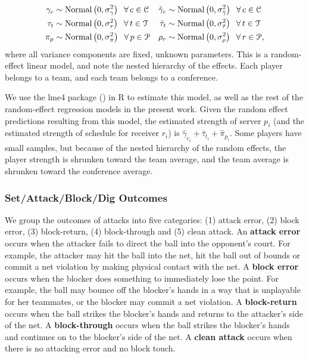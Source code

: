 \documentclass[USenglish]{article}
\theoremstyle{dgthm}
\theoremstyle{dgdef}
\begin{document}
\begin{align*}
  \gamma_c &\sim \mbox{Normal}\left(0, \sigma^2_\gamma\right) \hspace{2mm} \forall\, c \in \mathcal{C} &
  \tilde\gamma_c &\sim \mbox{Normal}\left(0, \sigma^2_{\tilde\gamma}\right) \hspace{2mm} \forall\, c \in \mathcal{C} \\
  \tau_t &\sim \mbox{Normal}\left(0, \sigma^2_\tau\right) \hspace{2mm} \forall\, t \in \mathcal{T} &
  \tilde\tau_t &\sim \mbox{Normal}\left(0, \sigma^2_{\tilde\tau}\right) \hspace{2mm} \forall\, t \in \mathcal{T} \\
  \pi_p &\sim \mbox{Normal}\left(0, \sigma^2_\pi\right) \hspace{2mm} \forall\, p \in \mathcal{P} &
  \rho_r &\sim \mbox{Normal}\left(0, \sigma^2_\rho\right) \hspace{2mm} \forall\, r \in \mathcal{P},
\end{align*}
where all variance components are fixed, unknown parameters. This is a random-effect linear model, and note the nested hierarchy of the effects. Each player belongs to a team, and each team belongs to a conference.

We use the lme4 package (\cite{bates_etal_2015}) in R to estimate this model, as well as the rest of the random-effect regression models in the present work. Given the random effect predictions resulting from this model, the estimated strength of server $p_i$ (and the estimated strength of schedule for receiver $r_i$) is $\hat\gamma_{c_i} + \hat\tau_{t_i} + \hat\pi_{p_i}$. Some players have small samples, but because of the nested hierarchy of the random effects, the player strength is shrunken toward the team average, and the team average is shrunken toward the conference average.

\subsubsection{Set/Attack/Block/Dig Outcomes}
\label{sec:sos-attack}

We group the outcomes of attacks into five categories: (1) attack error, (2) block error, (3) block-return, (4) block-through and (5) clean attack. An {\bf attack error} occurs when the attacker fails to direct the ball into the opponent's court. For example, the attacker may hit the ball into the net, hit the ball out of bounds or commit a net violation by making physical contact with the net. A {\bf block error} occurs when the blocker does something to immediately lose the point. For example, the ball may bounce off the blocker's hands in a way that is unplayable for her teammates, or the blocker may commit a net violation. A {\bf block-return} occurs when the ball strikes the blocker's hands and returns to the attacker's side of the net. A {\bf block-through} occurs when the ball strikes the blocker's hands and continues on to the blocker's side of the net. A {\bf clean attack} occurs when there is no attacking error and no block touch.
\end{document}
